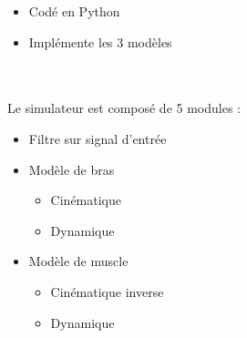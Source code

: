 \documentclass[pdftex,a4paper,11pt]{article}
\begin{document}
\begin{itemize}
    \item Codé en Python
    \item Implémente les 3 modèles
\end{itemize}

\begin{figure}
    \centering
    ~~~
    ~~~
\end{figure}

\paragraph{}
Le simulateur est composé de 5 modules :
\begin{itemize}
    \item Filtre sur signal d'entrée
    \item Modèle de bras
    \begin{itemize}
        \item Cinématique
        \item Dynamique
    \end{itemize}
    \item Modèle de muscle
    \begin{itemize}
        \item Cinématique inverse
        \item Dynamique
    \end{itemize}
\end{itemize}
\end{document}
